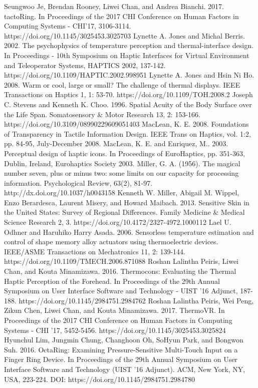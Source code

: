 \documentclass[preprint,12pt]{elsarticle}
\begin{document}
\begin{thebibliography}{00}
Seungwoo Je, Brendan Rooney, Liwei Chan, and Andrea Bianchi. 2017. tactoRing. In Proceedings of the 2017 CHI Conference on Human Factors in Computing Systems - CHI'17, 3106-3114. https://doi.org/10.1145/3025453.3025703
Lynette A. Jones and Michal Berris. 2002. The psychophysics of temperature perception and thermal-interface design. In Proceedings - 10th Symposium on Haptic Interfaces for Virtual Environment and Teleoperator Systems, HAPTICS 2002, 137-142. https://doi.org/10.1109/HAPTIC.2002.998951
Lynette A. Jones and Hsin Ni Ho. 2008. Warm or cool, large or small? The challenge of thermal displays. IEEE Transactions on Haptics 1, 1: 53-70. https://doi.org/10.1109/TOH.2008.2
Joseph C. Stevens and Kenneth K. Choo. 1996. Spatial Acuity of the Body Surface over the Life Span. Somatosensory \& Motor Research 13, 2: 153-166. https://doi.org/10.3109/08990229609051403
MacLean, K. E. 2008. Foundations of Transparency in Tactile Information Design. IEEE Trans on Haptics, vol. 1:2, pp. 84-95, July-December 2008.
MacLean, K. E. and Enriquez, M.. 2003. Perceptual design of haptic icons. In Proceedings of EuroHaptics, pp. 351-363, Dublin, Ireland, Eurohaptics Society 2003.
Miller, G. A. (1956). The magical number seven, plus or minus two: some limits on our capacity for processing information. Psychological Review, 63(2), 81-97. http://dx.doi.org/10.1037/h0043158
Kenneth W. Miller, Abigail M. Wippel, Enzo Berardesca, Laurent Misery, and Howard Maibach. 2013. Sensitive Skin in the United States: Survey of Regional Differences. Family Medicine \& Medical Science Research 2, 3. https://doi.org/10.4172/2327-4972.1000112
Lael U. Odhner and Haruhiko Harry Asada. 2006. Sensorless temperature estimation and control of shape memory alloy actuators using thermoelectric devices. IEEE/ASME Transactions on Mechatronics 11, 2: 139-144. https://doi.org/10.1109/TMECH.2006.871088
Roshan Lalintha Peiris, Liwei Chan, and Kouta Minamizawa. 2016. Thermocons: Evaluating the Thermal Haptic Perception of the Forehead. In Proceedings of the 29th Annual Symposium on User Interface Software and Technology - UIST '16 Adjunct, 187-188. https://doi.org/10.1145/2984751.2984762
Roshan Lalintha Peiris, Wei Peng, Zikun Chen, Liwei Chan, and Kouta Minamizawa. 2017. ThermoVR. In Proceedings of the 2017 CHI Conference on Human Factors in Computing Systems - CHI '17, 5452-5456. https://doi.org/10.1145/3025453.3025824
Hyunchul Lim, Jungmin Chung, Changhoon Oh, SoHyun Park, and Bongwon Suh. 2016. OctaRing: Examining Pressure-Sensitive Multi-Touch Input on a Finger Ring Device. In Proceedings of the 29th Annual Symposium on User Interface Software and Technology (UIST '16 Adjunct). ACM, New York, NY, USA, 223-224. DOI: https://doi.org/10.1145/2984751.2984780

\end{thebibliography}
\end{document}
